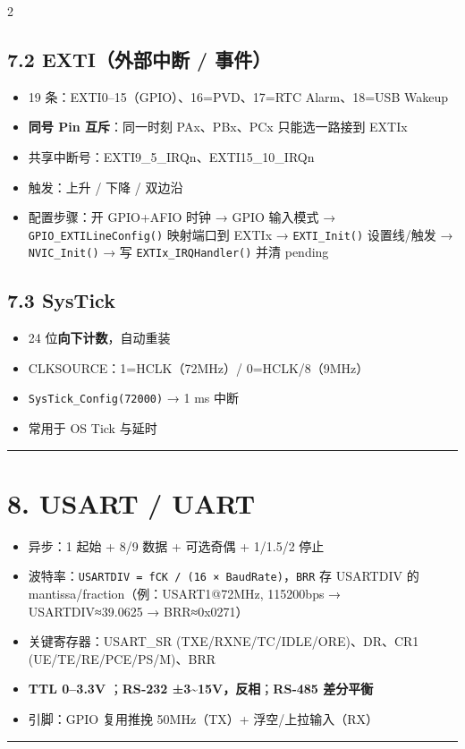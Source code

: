 \documentclass[UTF8,zihao=-5]{ctexart}
\begin{document}
\begin{multicols*}{2}
\subsection*{7.2 EXTI（外部中断 / 事件）}
\begin{itemize}
\item 19 条：EXTI0–15（GPIO）、16=PVD、17=RTC Alarm、18=USB Wakeup
\item \textbf{同号 Pin 互斥}：同一时刻 PAx、PBx、PCx 只能选一路接到 EXTIx
\item 共享中断号：EXTI9\_5\_IRQn、EXTI15\_10\_IRQn
\item 触发：上升 / 下降 / 双边沿
\item 配置步骤：开 GPIO+AFIO 时钟 → GPIO 输入模式 → \texttt{GPIO\_EXTILineConfig()} 映射端口到 EXTIx → \texttt{EXTI\_Init()} 设置线/触发 → \texttt{NVIC\_Init()} → 写 \texttt{EXTIx\_IRQHandler()} 并清 pending
\end{itemize}
\subsection*{7.3 SysTick}
\begin{itemize}
\item 24 位\textbf{向下计数}，自动重装
\item CLKSOURCE：1=HCLK（72MHz）/ 0=HCLK/8（9MHz）
\item \texttt{SysTick\_Config(72000)} → 1 ms 中断
\item 常用于 OS Tick 与延时
\end{itemize}
\vspace{1pt}\hrule\vspace{1pt}
\section*{8. USART / UART}
\begin{itemize}
\item 异步：1 起始 + 8/9 数据 + 可选奇偶 + 1/1.5/2 停止
\item 波特率：\texttt{USARTDIV = fCK / (16 × BaudRate)}，\texttt{BRR} 存 USARTDIV 的 mantissa/fraction（例：USART1@72MHz, 115200bps → USARTDIV≈39.0625 → BRR≈0x0271）
\item 关键寄存器：USART\_SR (TXE/RXNE/TC/IDLE/ORE)、DR、CR1 (UE/TE/RE/PCE/PS/M)、BRR
\item \textbf{TTL 0–3.3V} ；\textbf{RS‑232 ±3\textasciitilde{}15V，反相}；\textbf{RS‑485 差分平衡}
\item 引脚：GPIO 复用推挽 50MHz（TX）+ 浮空/上拉输入（RX）
\end{itemize}
\vspace{1pt}\hrule\vspace{1pt}

\end{multicols*}
\end{document}
